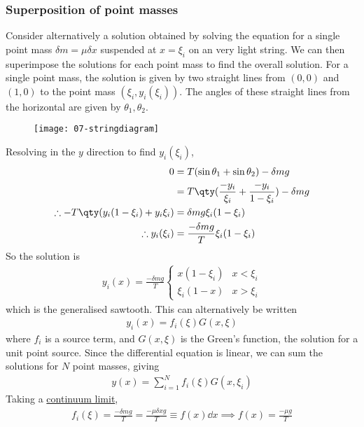 \subsubsection{Superposition of point masses}
Consider alternatively a solution obtained by solving the equation for a single point mass $\delta m = \mu \delta x$ suspended at $x = \xi_i$ on an very light string.
We can then superimpose the solutions for each point mass to find the overall solution.
For a single point mass, the solution is given by two straight lines from $(0,0)$ and $(1,0)$ to the point mass $(\xi_i, y_i(\xi_i))$.
The angles of these straight lines from the horizontal are given by $\theta_1, \theta_2$.
\begin{figure}[h] 
    \centering 
    \texttt{[image: 07-stringdiagram]} 
\end{figure}
Resolving in the $y$ direction to find $y_i(\xi_i)$,
\begin{align*}
	0 & = T (\sin \theta_1 + \sin \theta_2) - \delta m g \\
	& = T\qty(\frac{-y_i}{\xi_i} + \frac{-y_i}{1-\xi_i}) - \delta m g \\
	\therefore -T\qty(y_i(1-\xi_i) + y_i \xi_i) & = \delta m g \xi_i(1-\xi_i) \\
	\therefore y_i(\xi_i) & = \frac{-\delta m g}{T} \xi_i (1-\xi_i)
\end{align*}
So the solution is
\begin{align*}
	y_i(x) = \frac{-\delta m g}{T} \begin{cases}
		x(1-\xi_i)    & x < \xi_i \\
		\xi_i (1 - x) & x > \xi_i
	\end{cases}
\end{align*}
which is the generalised sawtooth.
This can alternatively be written
\begin{align} \label{eq:7.4}
	y_i(x) = f_i(\xi) G(x,\xi)
\end{align}
where $f_i$ is a source term, and $G(x,\xi)$ is the Green's function, the solution for a unit point source.
Since the differential equation is linear, we can sum the solutions for $N$ point masses, giving
\begin{align*}
	y(x) = \sum_{i=1}^N f_i(\xi) G(x, \xi_i)
\end{align*}
Taking a \underline{continuum limit},
\begin{align*}
	f_i(\xi) = \frac{-\delta m g}{T} = \frac{-\mu \delta x g}{T} \equiv f(x) \dd{x} \implies f(x) = \frac{-\mu g}{T}
\end{align*}

